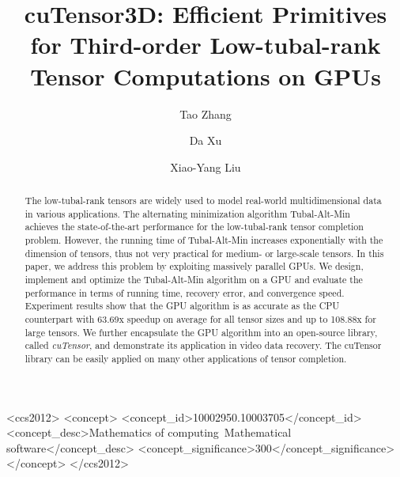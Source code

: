 \documentclass[format=acmsmall, review=false, screen=true]{acmart}
\begin{document}
\title[A Library for Low-tubal-rank Tensor Computations on GPUs]{cuTensor3D: Efficient Primitives for Third-order Low-tubal-rank Tensor Computations on GPUs}

\author{Tao Zhang}
\author{Da Xu}
\author{Xiao-Yang Liu}


\begin{abstract}

The low-tubal-rank tensors are widely used to model real-world multidimensional data in various applications. The alternating minimization algorithm Tubal-Alt-Min achieves the state-of-the-art performance for the low-tubal-rank tensor completion problem. However, the running time of Tubal-Alt-Min increases exponentially with the dimension of tensors, thus not very practical for medium- or large-scale tensors. In this paper, we address this problem by exploiting massively parallel GPUs. We design, implement and optimize the Tubal-Alt-Min algorithm on a GPU and evaluate the performance in terms of running time, recovery error, and convergence speed. Experiment results show that the GPU algorithm is as accurate as the CPU counterpart with 63.69x speedup on average for all tensor sizes and up to 108.88x for large  tensors. We further encapsulate the GPU algorithm into an open-source library, called \textit{cuTensor}, and demonstrate its application in video data recovery. The cuTensor library can be easily applied on many other applications of tensor completion.


\end{abstract}


%
%
\begin{CCSXML}
<ccs2012>
<concept>
<concept_id>10002950.10003705</concept_id>
<concept_desc>Mathematics of computing~Mathematical software</concept_desc>
<concept_significance>300</concept_significance>
</concept>
</ccs2012>
\end{CCSXML}
\end{document}
